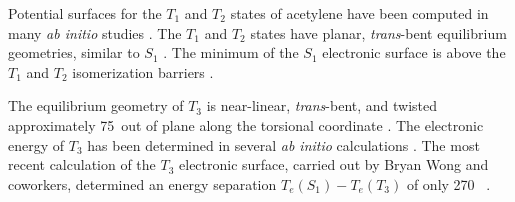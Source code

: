 \documentclass[12pt]{mitthesis}
\begin{document}


Potential surfaces for the $T_1$ and $T_2$ states of acetylene have
been computed in many \emph{ab initio} studies \cite{demoulin75,
  wetmore78, lischka86, yamaguchi93, cui96, cui97, malsch98, dallos02,
  ventura03}.  The $T_1$ and $T_2$ states have planar,
\emph{trans}-bent equilibrium geometries, similar to $S_1$
\cite{demoulin75, wetmore78, yamaguchi93}.  The minimum of the $S_1$
electronic surface is above the $T_1$ and $T_2$ isomerization barriers
\cite{vacek96, sherrill96}.

The equilibrium geometry of $T_3$ is near-linear, \emph{trans}-bent,
and twisted approximately 75\degrees\ out of plane along the torsional
coordinate \cite{ventura03, thom07}.  The electronic energy of $T_3$
has been determined in several \emph{ab initio} calculations
\cite{malsch98, ventura03, thom07}.
The most recent calculation of the $T_3$ electronic surface, carried
out by Bryan Wong and coworkers, determined an energy separation
$T_e(S_1)-T_e(T_3)$ of only 270 \rcm\ \cite{thom07}.




\end{document}
